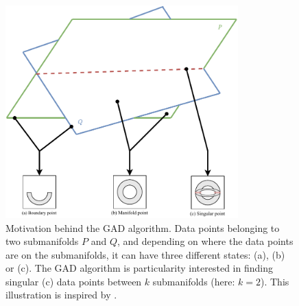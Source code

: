 \begin{figure}[H]
    \centering
    \includegraphics[width=0.8\textwidth]{thesis/figures/geometric-anomaly-detection-motivation_cropped.pdf}
    \caption{Motivation behind the GAD algorithm. Data points belonging to two submanifolds $P$ and $Q$, and depending on where the data points are on the submanifolds, it can have three different states: (a), (b) or (c). The GAD algorithm is particularity interested in finding singular (c) data points between $k$ submanifolds (here: $k=2$). This illustration is inspired by \cite[Figure 1]{stolz2020geometric}.}
    \label{fig:gad-motivation}
\end{figure}

